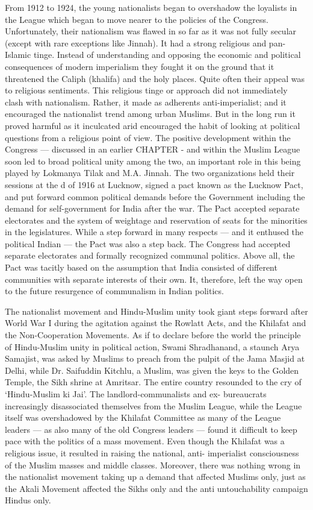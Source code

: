 From 1912 to 1924, the young nationalists began to overshadow the loyalists in the League which began to move nearer to the policies of the Congress. Unfortunately, their nationalism was flawed in so far as it was not fully secular (except with rare exceptions like Jinnah). It had a strong religious and pan-Islamic tinge. Instead of understanding and opposing the economic and political consequences of modern imperialism they fought it on the ground that it threatened the Caliph (khalifa) and the holy places. Quite often their appeal was to religious sentiments. This religious tinge or approach did not immediately clash with nationalism. Rather, it made as adherents anti-imperialist; and it encouraged the nationalist trend among urban Muslims. But in the long run it proved harmful as it inculcated arid encouraged the habit of looking at political questions from a religious point of view. The positive development within the Congress — discussed in an earlier CHAPTER - and within the Muslim League soon led to broad political unity among the two, an important role in this being played by Lokmanya Tilak and M.A. Jinnah. The two organizations held their sessions at the d of 1916 at Lucknow, signed a pact known as the Lucknow Pact, and put forward common political demands before the Government including the demand for self-government for India after the war. The Pact accepted separate electorates and the system of weightage and reservation of seats for the minorities in the legislatures. While a step forward in many respects — and it enthused the political Indian — the Pact was also a step back. The Congress had accepted separate electorates and formally recognized communal politics. Above all, the Pact was tacitly based on the assumption that India consisted of different communities with separate interests of their own. It, therefore, left the way open to the future resurgence of communalism in Indian politics. 

The nationalist movement and Hindu-Muslim unity took giant steps forward after World War I during the agitation against the Rowlatt Acts, and the Khilafat and the Non-Cooperation Movements. As if to declare before the world the principle of Hindu-Muslim unity in political action, Swami Shradhanand, a staunch Arya Samajist, was asked by Muslims to preach from the pulpit of the Jama Masjid at Delhi, while Dr. Saifuddin Kitchlu, a Muslim, was given the keys to the Golden Temple, the Sikh shrine at Amritsar. The entire country resounded to the cry of `Hindu-Muslim ki Jai'. The landlord-communalists and ex- bureaucrats increasingly disassociated themselves from the Muslim League, while the League itself was overshadowed by the Khilafat Committee as many of the League leaders — as also many of the old Congress leaders — found it difficult to keep pace with the politics of a mass movement. Even though the Khilafat was a religious issue, it resulted in raising the national, anti- imperialist consciousness of the Muslim masses and middle classes. Moreover, there was nothing wrong in the nationalist movement taking up a demand that affected Muslims only, just as the Akali Movement affected the Sikhs only and the anti­ untouchability campaign Hindus only. 


